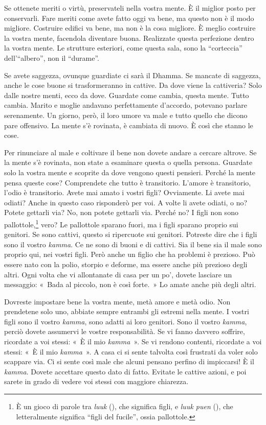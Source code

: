 Se ottenete meriti o virtù, preservateli nella vostra mente. È il
miglior posto per conservarli. Fare meriti come avete fatto oggi va
bene, ma questo non è il modo migliore. Costruire edifici va bene, ma
non è la cosa migliore. È meglio costruire la vostra mente, facendola
diventare buona. Realizzate questa perfezione dentro la vostra mente. Le
strutture esteriori, come questa sala, sono la ``corteccia''
dell'``albero'', non il ``durame''.

Se avete saggezza, ovunque guardiate ci sarà il Dhamma. Se mancate di
saggezza, anche le cose buone si trasformeranno in cattive. Da dove
viene la cattiveria? Solo dalle nostre menti, ecco da dove. Guardate
come cambia, questa mente. Tutto cambia. Marito e moglie andavano
perfettamente d'accordo, potevano parlare serenamente. Un giorno, però,
il loro umore va male e tutto quello che dicono pare offensivo. La mente
s'è rovinata, è cambiata di nuovo. È così che stanno le cose.

Per rinunciare al male e coltivare il bene non dovete andare a cercare
altrove. Se la mente s'è rovinata, non state a esaminare questa o quella
persona. Guardate solo la vostra mente e scoprite da dove vengono questi
pensieri. Perché la mente pensa queste cose? Comprendete che tutto è
transitorio. L'amore è transitorio, l'odio è transitorio. Avete mai
amato i vostri figli? Ovviamente. Li avete mai odiati? Anche in questo
caso risponderò per voi. A volte li avete odiati, o no? Potete gettarli
via? No, non potete gettarli via. Perché no? I figli non sono
pallottole,\footnote{È un gioco di parole tra \emph{luuk} (), che
  significa figli, e \emph{luuk puen} (), che letteralmente
  significa ``figli del fucile'', ossia pallottole.} vero? Le pallottole
sparano fuori, ma i figli sparano proprio sui genitori. Se sono cattivi,
questo si ripercuote sui genitori. Potreste dire che i figli sono il
vostro \emph{kamma}. Ce ne sono di buoni e di cattivi. Sia il bene sia
il male sono proprio qui, nei vostri figli. Però anche un figlio che ha
problemi è prezioso. Può essere nato con la polio, storpio e deforme, ma
essere anche più prezioso degli altri. Ogni volta che vi allontanate di
casa per un po', dovete lasciare un messaggio: «~Bada al piccolo, non è
così forte.~» Lo amate anche più degli altri.

Dovreste impostare bene la vostra mente, metà amore e metà odio. Non
prendetene solo uno, abbiate sempre entrambi gli estremi nella mente. I
vostri figli sono il vostro \emph{kamma}, sono adatti ai loro genitori.
Sono il vostro \emph{kamma}, perciò dovete assumervi le vostre
responsabilità. Se vi fanno davvero soffrire, ricordate a voi stessi:
«~È il mio \emph{kamma~}». Se vi rendono contenti, ricordate a voi
stessi: «~È il mio \emph{kamma}~». A casa ci si sente talvolta così
frustrati da voler solo scappare via. Ci si sente così male che alcuni
pensano perfino di impiccarsi! È il \emph{kamma}. Dovete accettare
questo dato di fatto. Evitate le cattive azioni, e poi sarete in grado
di vedere voi stessi con maggiore chiarezza.

